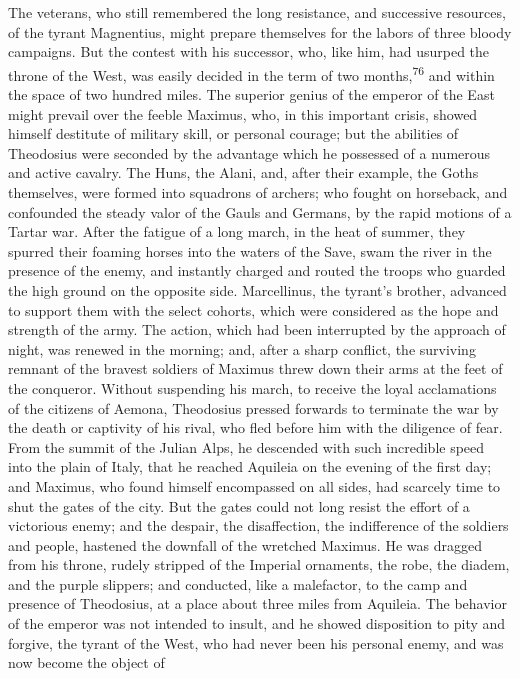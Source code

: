 The veterans, who still remembered the long resistance, and
successive resources, of the tyrant Magnentius, might prepare
themselves for the labors of three bloody campaigns. But the
contest with his successor, who, like him, had usurped the throne
of the West, was easily decided in the term of two months,\textsuperscript{76} and
within the space of two hundred miles. The superior genius of the
emperor of the East might prevail over the feeble Maximus, who,
in this important crisis, showed himself destitute of military
skill, or personal courage; but the abilities of Theodosius were
seconded by the advantage which he possessed of a numerous and
active cavalry. The Huns, the Alani, and, after their example,
the Goths themselves, were formed into squadrons of archers; who
fought on horseback, and confounded the steady valor of the Gauls
and Germans, by the rapid motions of a Tartar war. After the
fatigue of a long march, in the heat of summer, they spurred
their foaming horses into the waters of the Save, swam the river
in the presence of the enemy, and instantly charged and routed
the troops who guarded the high ground on the opposite side.
Marcellinus, the tyrant’s brother, advanced to support them with
the select cohorts, which were considered as the hope and
strength of the army. The action, which had been interrupted by
the approach of night, was renewed in the morning; and, after a
sharp conflict, the surviving remnant of the bravest soldiers of
Maximus threw down their arms at the feet of the conqueror.
Without suspending his march, to receive the loyal acclamations
of the citizens of Aemona, Theodosius pressed forwards to
terminate the war by the death or captivity of his rival, who
fled before him with the diligence of fear. From the summit of
the Julian Alps, he descended with such incredible speed into the
plain of Italy, that he reached Aquileia on the evening of the
first day; and Maximus, who found himself encompassed on all
sides, had scarcely time to shut the gates of the city. But the
gates could not long resist the effort of a victorious enemy; and
the despair, the disaffection, the indifference of the soldiers
and people, hastened the downfall of the wretched Maximus. He was
dragged from his throne, rudely stripped of the Imperial
ornaments, the robe, the diadem, and the purple slippers; and
conducted, like a malefactor, to the camp and presence of
Theodosius, at a place about three miles from Aquileia. The
behavior of the emperor was not intended to insult, and he showed
disposition to pity and forgive, the tyrant of the West, who had
never been his personal enemy, and was now become the object of
